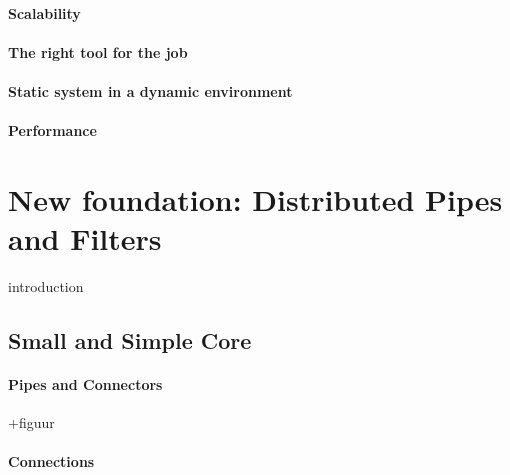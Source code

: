 \paragraph{Scalability} %

\paragraph{The right tool for the job} %

\paragraph{Static system in a dynamic environment} %

\paragraph{Performance} %

\section{New foundation: Distributed Pipes and Filters}

introduction

\subsection{Small and Simple Core}

\paragraph{Pipes and Connectors} +figuur

\paragraph{Connections} %

